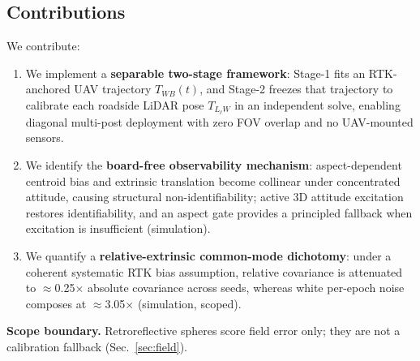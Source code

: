 \subsection{Contributions}
We contribute:
\begin{enumerate}
  \item We implement a \textbf{separable two-stage framework}: Stage-1 fits an
    RTK-anchored UAV trajectory $T_{WB}(t)$, and Stage-2 freezes that trajectory to
    calibrate each roadside LiDAR pose $T_{L_\ell W}$ in an independent solve,
    enabling diagonal multi-post deployment with zero FOV overlap and no UAV-mounted
    sensors.
  \item We identify the \textbf{board-free observability mechanism}: aspect-dependent
    centroid bias and extrinsic translation become collinear under concentrated
    attitude, causing structural non-identifiability; active 3D attitude excitation
    restores identifiability, and an aspect gate provides a principled fallback when
    excitation is insufficient (simulation).
  \item We quantify a \textbf{relative-extrinsic common-mode dichotomy}: under a
    coherent systematic RTK bias assumption, relative covariance is attenuated to
    $\approx$0.25$\times$ absolute covariance across seeds, whereas white per-epoch
    noise composes at $\approx$3.05$\times$ (simulation, scoped).
\end{enumerate}

\textbf{Scope boundary.}
Retroreflective spheres score field error only; they are not a calibration fallback
(Sec.~\ref{sec:field}).
